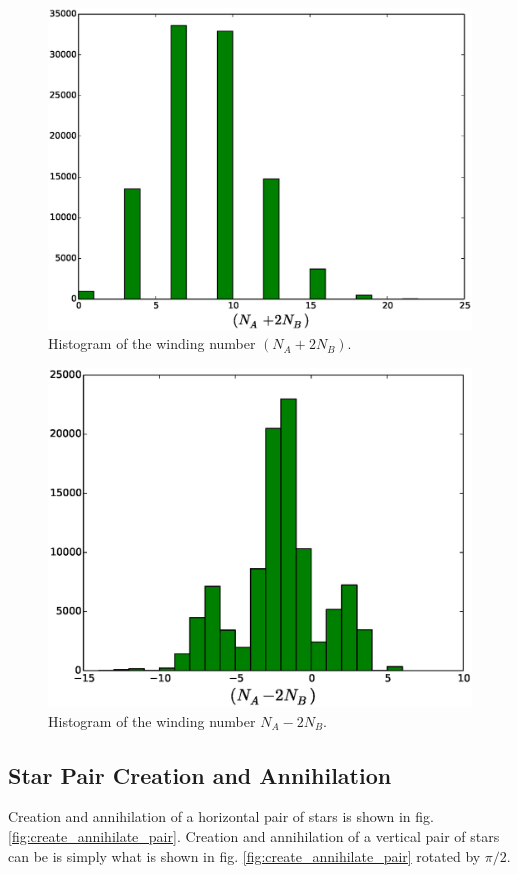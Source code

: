 \documentclass[aps,floatfix,11pt]{revtex4-1}
\begin{document}
\begin{figure}[h]
    \centering
    \includegraphics[width=8.5 cm]{W_vrt_NAp2NB_no_mod_str_dmr_mdl}
    \caption{Histogram of the winding number $(N_A + 2N_B)$.\label{}}
\end{figure}


\begin{figure}[h]
    \centering
    \includegraphics[width=8.5 cm]{W_vrt_NAm2NB_str_dmr_mdl}
    \caption{Histogram of the winding number $N_A - 2N_B$.\label{}}
\end{figure}

\clearpage
\subsection{Star Pair Creation and Annihilation}

Creation and annihilation of a horizontal pair of stars is shown in fig.
\ref{fig:create_annihilate_pair}. Creation and annihilation of a vertical pair of stars can be
is simply what is shown in fig. \ref{fig:create_annihilate_pair} rotated by $\pi/2$.
\end{document}
